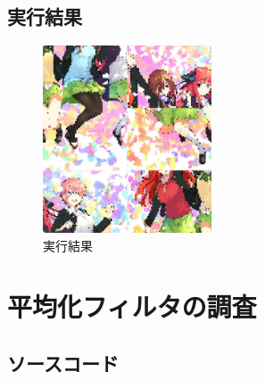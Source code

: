 \documentclass[a4paper,11pt,titlepage]{bxjsarticle}
\begin{document}
\subsection{実行結果}
\clearpage
\begin{figure}
  \centering
  \includegraphics[width=5cm]{mosaic_result.jpg}
  \caption{実行結果}
\end{figure}

\section{平均化フィルタの調査}

\subsection{ソースコード}




\end{document}
